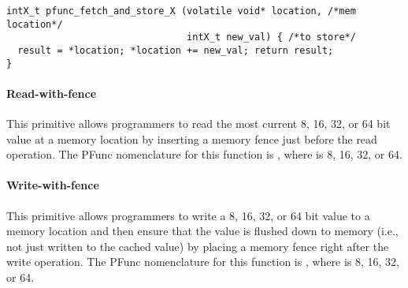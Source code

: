 \begin{center}
\begin{minipage}{0.7\textwidth}
\begin{lstlisting}
intX_t pfunc_fetch_and_store_X (volatile void* location, /*mem location*/
                                intX_t new_val) { /*to store*/
  result = *location; *location += new_val; return result;
}
\end{lstlisting}
\end{minipage}
\end{center}

\paragraph{Read-with-fence} This primitive allows programmers to read the most
current 8, 16, 32, or 64 bit value at a memory location by inserting a memory
fence just before the read operation. 
%
The PFunc nomenclature for this function is , 
where  is 8, 16, 32, or 64.

\paragraph{Write-with-fence} This primitive allows programmers to write a 8,
16, 32, or 64 bit value to a memory location and then ensure that the value is
flushed down to memory (i.e., not just written to the cached value) by placing
a memory fence right after the write operation. 
%
The PFunc nomenclature for this function is , 
where  is 8, 16, 32, or 64.
